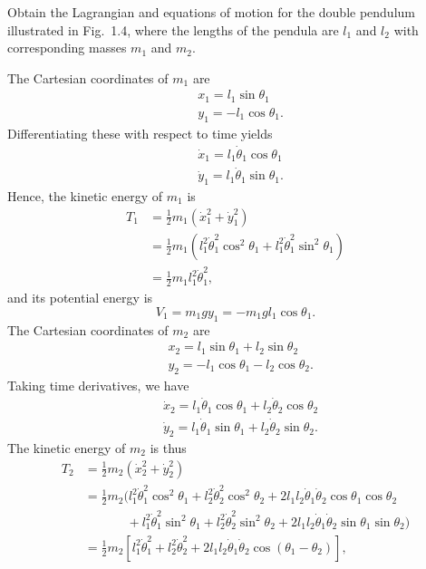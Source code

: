 \begin{questions}
\question
Obtain the Lagrangian and equations of motion for the double pendulum illustrated in Fig.~1.4, where the lengths of the pendula are $l_1$ and $l_2$ with corresponding masses $m_1$ and $m_2$.
\begin{solution}
The Cartesian coordinates of $m_1$ are
\begin{align*}
&x_1 = l_1 \sin \theta_1 \\
&y_1 = -l_1 \cos \theta_1.
\end{align*}
Differentiating these with respect to time yields
\begin{align*}
&\dot{x}_1 = l_1 \dot{\theta}_1 \cos \theta_1 \\
&\dot{y}_1 = l_1 \dot{\theta}_1 \sin \theta_1.
\end{align*}
Hence, the kinetic energy of $m_1$ is
\begin{align*}
T_1 &= \frac{1}{2} m_1 \left( \dot{x}_1^2 + \dot{y}_1^2 \right) \\
&= \frac{1}{2} m_1 \left( l_1^2 \dot{\theta}_1^2 \cos^2 \theta_1 + l_1^2 \dot{\theta}_1^2 \sin^2 \theta_1 \right) \\
&= \frac{1}{2} m_1 l_1^2 \dot{\theta}_1^2,
\end{align*}
and its potential energy is
\[
V_1 = m_1 g y_1 = -m_1 g l_1 \cos \theta_1.
\]
The Cartesian coordinates of $m_2$ are
\begin{align*}
&x_2 = l_1 \sin \theta_1 + l_2 \sin \theta_2 \\
&y_2 = -l_1 \cos \theta_1 - l_2 \cos \theta_2.
\end{align*}
Taking time derivatives, we have
\begin{align*}
&\dot{x}_2 = l_1 \dot{\theta}_1 \cos \theta_1 + l_2 \dot{\theta}_2 \cos \theta_2 \\
&\dot{y}_2 = l_1 \dot{\theta}_1 \sin \theta_1 + l_2 \dot{\theta}_2 \sin \theta_2.
\end{align*}
The kinetic energy of $m_2$ is thus
\begin{align*}
T_2 &= \frac{1}{2} m_2 \left( \dot{x}_2^2 + \dot{y}_2^2 \right) \\
&= \frac{1}{2} m_2 \bigl( l_1^2 \dot{\theta}_1^2 \cos^2 \theta_1 + l_2^2 \dot{\theta}_2^2 \cos^2 \theta_2 + 2 l_1 l_2 \dot{\theta}_1 \dot{\theta}_2 \cos \theta_1 \cos \theta_2 \\
&\phantom{=} \qquad + l_1^2 \dot{\theta}_1^2 \sin^2 \theta_1 + l_2^2 \dot{\theta}_2^2 \sin^2 \theta_2 + 2 l_1 l_2 \dot{\theta}_1 \dot{\theta}_2 \sin \theta_1 \sin \theta_2 \bigr) \\
&= \frac{1}{2} m_2 \left[ l_1^2 \dot{\theta}_1^2 + l_2^2 \dot{\theta}_2^2 + 2 l_1 l_2 \dot{\theta}_1 \dot{\theta}_2 \cos \left( \theta_1 - \theta_2 \right) \right],

\end{align*}
\end{solution}
\end{questions}
